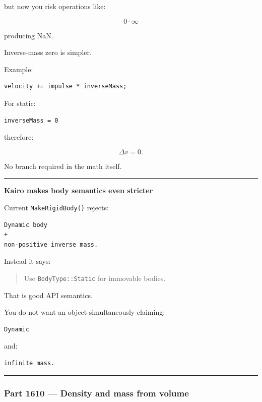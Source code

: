 but now you risk operations like:

\[
0\cdot\infty
\]

producing NaN.

Inverse-mass zero is simpler.

Example:

\begin{verbatim}
velocity += impulse * inverseMass;
\end{verbatim}

For static:

\begin{verbatim}
inverseMass = 0
\end{verbatim}

therefore:

\[
\Delta v=0.
\]

No branch required in the math itself.

\begin{center}\rule{0.5\linewidth}{0.5pt}\end{center}

\textbf{Kairo makes body semantics even stricter}

Current \texttt{MakeRigidBody()} rejects:

\begin{verbatim}
Dynamic body
+
non-positive inverse mass.
\end{verbatim}

Instead it says:

\begin{quote}
Use \texttt{BodyType::Static} for immovable bodies.
\end{quote}

That is good API semantics.

You do not want an object simultaneously claiming:

\begin{verbatim}
Dynamic
\end{verbatim}

and:

\begin{verbatim}
infinite mass.
\end{verbatim}

\begin{center}\rule{0.5\linewidth}{0.5pt}\end{center}

\subsubsection{Part 1610 --- Density and mass from volume}\label{part-1610-density-and-mass-from-volume}

